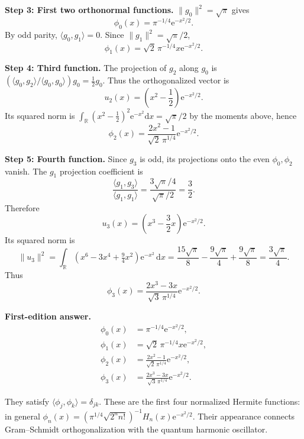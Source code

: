 \documentclass[11pt,a4paper]{article}
\newcommand{\dd}{\mathrm{d}}
\newcommand{\ee}{\mathrm{e}}
\newcommand{\R}{\mathbb R}
\begin{document}
\textbf{Step 3: First two orthonormal functions.} $\|g_0\|^2=\sqrt\pi$ gives
\begin{equation}
\phi_0(x)=\pi^{-1/4}\ee^{-x^2/2}.
\end{equation}
By odd parity, $\langle g_0,g_1\rangle=0$. Since $\|g_1\|^2=\sqrt\pi/2$,
\begin{equation}
\phi_1(x)=\sqrt2\,\pi^{-1/4}x\ee^{-x^2/2}.
\end{equation}

\textbf{Step 4: Third function.} The projection of $g_2$ along $g_0$ is $(\langle g_0,g_2\rangle/\langle g_0,g_0\rangle)g_0=\frac12g_0$. Thus the orthogonalized vector is
\begin{equation}
u_2(x)=\left(x^2-\frac12\right)\ee^{-x^2/2}.
\end{equation}
Its squared norm is $\int_\R(x^2-\frac12)^2\ee^{-x^2}\dd x=\sqrt\pi/2$ by the moments above, hence
\begin{equation}
\phi_2(x)=\frac{2x^2-1}{\sqrt2\,\pi^{1/4}}\ee^{-x^2/2}.
\end{equation}

\textbf{Step 5: Fourth function.} Since $g_3$ is odd, its projections onto the even $\phi_0,\phi_2$ vanish. The $g_1$ projection coefficient is
\begin{equation}
\frac{\langle g_1,g_3\rangle}{\langle g_1,g_1\rangle}
=\frac{3\sqrt\pi/4}{\sqrt\pi/2}=\frac32.
\end{equation}
Therefore
\begin{equation}
u_3(x)=\left(x^3-\frac32x\right)\ee^{-x^2/2}.
\end{equation}
Its squared norm is
\begin{equation}
\|u_3\|^2=\int_\R(x^6-3x^4+\tfrac94x^2)\ee^{-x^2}\,\dd x
=\frac{15\sqrt\pi}{8}-\frac{9\sqrt\pi}{4}+\frac{9\sqrt\pi}{8}=\frac{3\sqrt\pi}{4}.
\end{equation}
Thus
\begin{equation}
\phi_3(x)=\frac{2x^3-3x}{\sqrt3\,\pi^{1/4}}\ee^{-x^2/2}.
\end{equation}
\begin{resultbox}
\textbf{First-edition answer.}
\begin{align*}
\phi_0(x)&=\pi^{-1/4}\ee^{-x^2/2},\\
\phi_1(x)&=\sqrt2\,\pi^{-1/4}x\ee^{-x^2/2},\\
\phi_2(x)&=\frac{2x^2-1}{\sqrt2\,\pi^{1/4}}\ee^{-x^2/2},\\
\phi_3(x)&=\frac{2x^3-3x}{\sqrt3\,\pi^{1/4}}\ee^{-x^2/2}.
\end{align*}
\end{resultbox}
They satisfy $\langle\phi_j,\phi_k\rangle=\delta_{jk}$. These are the first four normalized Hermite functions: in general $\phi_n(x)=(\pi^{1/4}\sqrt{2^nn!})^{-1}H_n(x)\ee^{-x^2/2}$. Their appearance connects Gram--Schmidt orthogonalization with the quantum harmonic oscillator.
\end{document}
